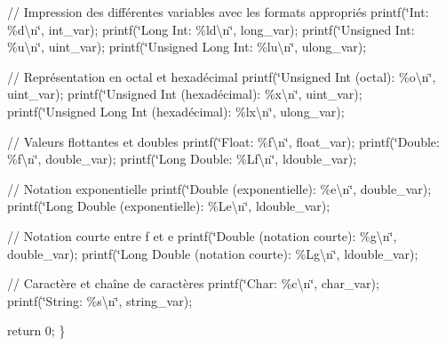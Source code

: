// Impression des différentes variables avec les formats appropriés printf(\char`\"{}\+Int\+: \%d\textbackslash{}n\char`\"{}, int\+\_\+var); printf(\char`\"{}\+Long Int\+: \%ld\textbackslash{}n\char`\"{}, long\+\_\+var); printf(\char`\"{}\+Unsigned Int\+: \%u\textbackslash{}n\char`\"{}, uint\+\_\+var); printf(\char`\"{}\+Unsigned Long Int\+: \%lu\textbackslash{}n\char`\"{}, ulong\+\_\+var);

// Représentation en octal et hexadécimal printf(\char`\"{}\+Unsigned Int (octal)\+: \%o\textbackslash{}n\char`\"{}, uint\+\_\+var); printf(\char`\"{}\+Unsigned Int (hexadécimal)\+: \%x\textbackslash{}n\char`\"{}, uint\+\_\+var); printf(\char`\"{}\+Unsigned Long Int (hexadécimal)\+: \%lx\textbackslash{}n\char`\"{}, ulong\+\_\+var);

// Valeurs flottantes et doubles printf(\char`\"{}\+Float\+: \%f\textbackslash{}n\char`\"{}, float\+\_\+var); printf(\char`\"{}\+Double\+: \%f\textbackslash{}n\char`\"{}, double\+\_\+var); printf(\char`\"{}\+Long Double\+: \%\+Lf\textbackslash{}n\char`\"{}, ldouble\+\_\+var);

// Notation exponentielle printf(\char`\"{}\+Double (exponentielle)\+: \%e\textbackslash{}n\char`\"{}, double\+\_\+var); printf(\char`\"{}\+Long Double (exponentielle)\+: \%\+Le\textbackslash{}n\char`\"{}, ldouble\+\_\+var);

// Notation courte entre f et e printf(\char`\"{}\+Double (notation courte)\+: \%g\textbackslash{}n\char`\"{}, double\+\_\+var); printf(\char`\"{}\+Long Double (notation courte)\+: \%\+Lg\textbackslash{}n\char`\"{}, ldouble\+\_\+var);

// Caractère et chaîne de caractères printf(\char`\"{}\+Char\+: \%c\textbackslash{}n\char`\"{}, char\+\_\+var); printf(\char`\"{}\+String\+: \%s\textbackslash{}n\char`\"{}, string\+\_\+var);

return 0; \} 

 